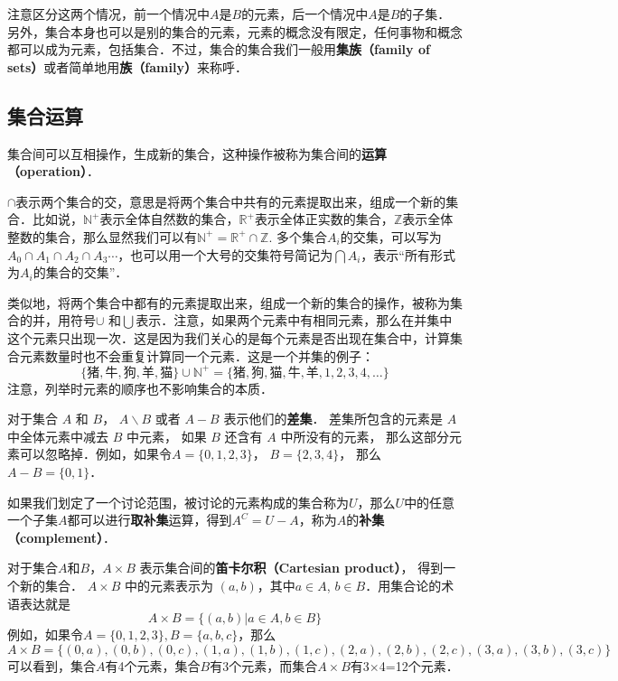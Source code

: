 注意区分这两个情况，前一个情况中$A$是$B$的元素，后一个情况中$A$是$B$的子集．另外，集合本身也可以是别的集合的元素，元素的概念没有限定，任何事物和概念都可以成为元素，包括集合．不过，集合的集合我们一般用\textbf{集族（family of sets）}或者简单地用\textbf{族（family）}来称呼．


\subsection{集合运算}

集合间可以互相操作，生成新的集合，这种操作被称为集合间的\textbf{运算（operation）}．

$\cap$表示两个集合的交，意思是将两个集合中共有的元素提取出来，组成一个新的集合．比如说，$\mathbb{N^+}$表示全体自然数的集合，$\mathbb{R^+}$表示全体正实数的集合，$\mathbb{Z}$表示全体整数的集合，那么显然我们可以有$\mathbb{N^+}=\mathbb{R^+}\cap\mathbb{Z}$. 多个集合$A_i$的交集，可以写为$A_0\cap A_1\cap A_2\cap A_3⋯$，也可以用一个大号的交集符号简记为$\bigcap A_i$，表示“所有形式为$A_i$的集合的交集”．

类似地，将两个集合中都有的元素提取出来，组成一个新的集合的操作，被称为集合的并，用符号$\cup$ 和$\bigcup$表示．注意，如果两个元素中有相同元素，那么在并集中这个元素只出现一次．这是因为我们关心的是每个元素是否出现在集合中，计算集合元素数量时也不会重复计算同一个元素．这是一个并集的例子：
\begin{equation}
\{\text{猪}, \text{牛}, \text{狗}, \text{羊}, \text{猫}\}\cup\mathbb{N^+}=\{\text{猪}, \text{狗}, \text{猫}, \text{牛}, \text{羊}, 1, 2,3,4,\dots\}
\end{equation}
注意，列举时元素的顺序也不影响集合的本质．

对于集合 $A$ 和 $B$， $A\backslash B$ 或者 $A-B$ 表示他们的\textbf{差集}． 差集所包含的元素是 $A$ 中全体元素中减去 $B$ 中元素， 如果 $B$ 还含有 $A$ 中所没有的元素， 那么这部分元素可以忽略掉．例如，如果令$A=\{0,1,2,3\}$， $B=\{2,3,4\}$， 那么 $A-B=\{0,1\}$．

如果我们划定了一个讨论范围，被讨论的元素构成的集合称为$U$，那么$U$中的任意一个子集$A$都可以进行\textbf{取补集}运算，得到$A^C=U-A$，称为$A$的\textbf{补集（complement）}．

对于集合$A$和$B$，$A\times B$ 表示集合间的\textbf{笛卡尔积（Cartesian product）}， 得到一个新的集合． $A\times B$ 中的元素表示为 $(a,b)$，其中$a\in A$, $b\in B$．用集合论的术语表达就是
\begin{equation}
A\times B=\{(a,b)|a\in A, b\in B\}
\end{equation}
例如，如果令$A=\{0,1,2,3\}, B=\{a, b, c\}$，那么
\begin{equation}
A\times B=\{ (0,a),(0,b),(0,c),(1,a),(1,b),(1,c),(2,a),(2,b),(2,c),(3,a),(3,b),(3,c) \}
\end{equation}
可以看到，集合$A$有4个元素，集合$B$有3个元素，而集合$A\times B$有3$\times$4=12个元素．

